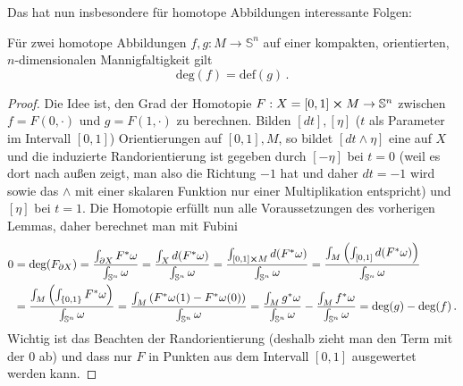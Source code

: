 \documentclass[../H_Analysis_main.tex]{subfiles}
\begin{document}
Das hat nun insbesondere für homotope Abbildungen interessante Folgen:
\begin{cor}
Für zwei homotope Abbildungen $f, g: M \rightarrow \mathbb{S}^n$ auf einer kompakten, orientierten, $n$-dimensionalen Mannigfaltigkeit gilt
\begin{equation}
\text{deg}(f) = \text{def}(g) \, .
\end{equation}
\end{cor}
\begin{proof}
Die Idee ist, den Grad der Homotopie $F: X = [0, 1] \cross M \rightarrow \mathbb{S}^n$ zwischen $f = F(0, \cdot)$ und $g = F(1, \cdot)$ zu berechnen. Bilden $[dt], [\eta]$ ($t$ als Parameter im Intervall $[0, 1]$) Orientierungen auf $[0, 1], M$, so bildet $[dt \wedge \eta]$ eine auf $X$ und die induzierte Randorientierung ist gegeben durch $[-\eta]$ bei $t = 0$ (weil es dort nach außen zeigt, man also die Richtung $-1$ hat und daher $dt = -1$ wird sowie das $\wedge$ mit einer skalaren Funktion nur einer Multiplikation entspricht) und $[\eta]$ bei $t = 1$. Die Homotopie erfüllt nun alle Voraussetzungen des vorherigen Lemmas, daher berechnet man mit Fubini
\begin{align*}
0 &= \text{deg}(F_{\partial X}) = \frac{\int_{\partial X} F^*\omega}{\int_{\mathbb{S}^n}\omega} = \frac{\int_X d\qty(F^*\omega)}{\int_{\mathbb{S}^n}\omega} = \frac{\int_{[0, 1] \cross M} d\qty(F^*\omega)}{\int_{\mathbb{S}^n}\omega} = \frac{\int_M \qty(\int_{[0, 1]} d\qty(F^*\omega))}{\int_{\mathbb{S}^n}\omega}
\\
&= \frac{\int_M \qty(\int_{\qty{0, 1}} F^*\omega)}{\int_{\mathbb{S}^n}\omega} = \frac{\int_M \qty(F^*\omega(1) - F^*\omega(0))}{\int_{\mathbb{S}^n}\omega} = \frac{\int_M g^*\omega}{\int_{\mathbb{S}^n}\omega} - \frac{\int_M f^*\omega}{\int_{\mathbb{S}^n}\omega} = \text{deg}(g) - \text{deg}(f) \, .
\end{align*}
Wichtig ist das Beachten der Randorientierung (deshalb zieht man den Term mit der 0 ab) und dass nur $F$ in Punkten aus dem Intervall $[0, 1]$ ausgewertet werden kann.
\end{proof}
\end{document}
